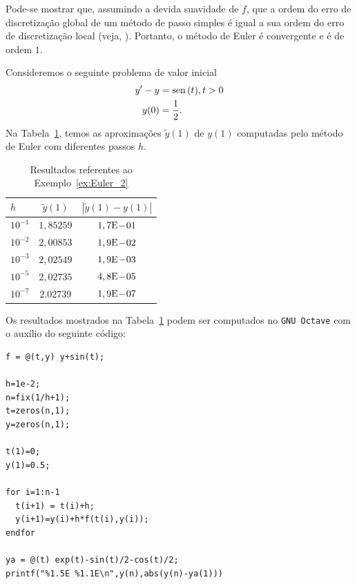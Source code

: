 \begin{obs}
  Pode-se mostrar que, assumindo a devida suavidade de $f$, que a ordem do erro de discretização global de um método de passo simples é igual a sua ordem do erro de discretização local (veja, \cite[Cap. 7, Seç. 7.2]{Stoer1993a}). Portanto, o método de Euler é convergente e é de ordem $1$.
\end{obs}

\begin{ex}\label{ex:Euler_1}
  Consideremos o seguinte problema de valor inicial
  \begin{align}
    y' - y &= \operatorname{sen}\,(t), t>0\label{eq:Euler_aux2}\\
    y(0) &= \frac{1}{2}.
  \end{align}
  Na Tabela~\ref{tab:ex_Euler_2}, temos as aproximações $\tilde{y}(1)$ de $y(1)$ computadas pelo método de Euler com diferentes passos $h$.
 
  \begin{table}[h!]
    \centering
    \begin{tabular}{l|cc}
      $h$ & $\tilde{y}(1)$ & $|\tilde{y}(1)-y(1)|$\\\hline
      $10^{-1}$ & $1,85259$ & $1,7\mathrm{E}\!-\!01$ \\
      $10^{-2}$ & $2,00853$ & $1,9\mathrm{E}\!-\!02$ \\
      $10^{-3}$ & $2,02549$ & $1,9\mathrm{E}\!-\!03$ \\
      $10^{-5}$ & $2,02735$ & $4,8\mathrm{E}\!-\!05$ \\
      $10^{-7}$ & $2.02739$ & $1,9\mathrm{E}\!-\!07$ \\\hline
    \end{tabular}
    \caption{Resultados referentes ao Exemplo~\ref{ex:Euler_2}}
    \label{tab:ex_Euler_2}
  \end{table}

\ifisoctave
Os resultados mostrados na Tabela~\ref{tab:ex_Euler_2} podem ser computados no \verb+GNU Octave+ com o auxílio do seguinte código:
\begin{verbatim}
f = @(t,y) y+sin(t);

h=1e-2;
n=fix(1/h+1);
t=zeros(n,1);
y=zeros(n,1);

t(1)=0;
y(1)=0.5;

for i=1:n-1
  t(i+1) = t(i)+h;
  y(i+1)=y(i)+h*f(t(i),y(i));
endfor

ya = @(t) exp(t)-sin(t)/2-cos(t)/2;
printf("%1.5E %1.1E\n",y(n),abs(y(n)-ya(1)))
\end{verbatim}
\fi
\end{ex}

